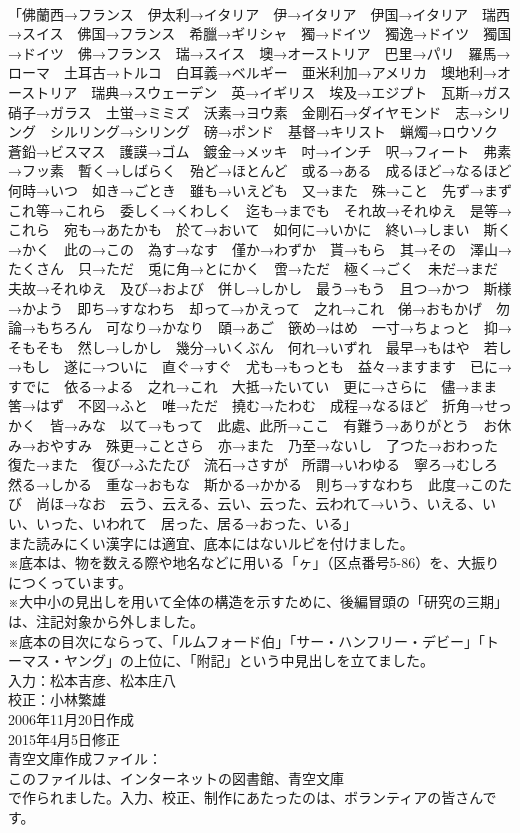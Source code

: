 \documentclass[8pt]{extreport}
\begin{document}
\begin{CJK}{UTF8}{min}
\\	「佛蘭西→フランス　伊太利→イタリア　伊→イタリア　伊国→イタリア　瑞西→スイス　佛国→フランス　希臘→ギリシャ　獨→ドイツ　獨逸→ドイツ　獨国→ドイツ　佛→フランス　瑞→スイス　墺→オーストリア　巴里→パリ　羅馬→ローマ　土耳古→トルコ　白耳義→ベルギー　亜米利加→アメリカ　墺地利→オーストリア　瑞典→スウェーデン　英→イギリス　埃及→エジプト　瓦斯→ガス　硝子→ガラス　土蛍→ミミズ　沃素→ヨウ素　金剛石→ダイヤモンド　志→シリング　シルリング→シリング　磅→ポンド　基督→キリスト　蝋燭→ロウソク　蒼鉛→ビスマス　護謨→ゴム　鍍金→メッキ　吋→インチ　呎→フィート　弗素→フッ素　暫く→しばらく　殆ど→ほとんど　或る→ある　成るほど→なるほど　何時→いつ　如き→ごとき　雖も→いえども　又→また　殊→こと　先ず→まず　これ等→これら　委しく→くわしく　迄も→までも　それ故→それゆえ　是等→これら　宛も→あたかも　於て→おいて　如何に→いかに　終い→しまい　斯く→かく　此の→この　為す→なす　僅か→わずか　貰→もら　其→その　澤山→たくさん　只→ただ　兎に角→とにかく　啻→ただ　極く→ごく　未だ→まだ　夫故→それゆえ　及び→および　併し→しかし　最う→もう　且つ→かつ　斯様→かよう　即ち→すなわち　却って→かえって　之れ→これ　俤→おもかげ　勿論→もちろん　可なり→かなり　頤→あご　篏め→はめ　一寸→ちょっと　抑→そもそも　然し→しかし　幾分→いくぶん　何れ→いずれ　最早→もはや　若し→もし　遂に→ついに　直ぐ→すぐ　尤も→もっとも　益々→ますます　已に→すでに　依る→よる　之れ→これ　大抵→たいてい　更に→さらに　儘→まま　筈→はず　不図→ふと　唯→ただ　撓む→たわむ　成程→なるほど　折角→せっかく　皆→みな　以て→もって　此處、此所→ここ　有難う→ありがとう　お休み→おやすみ　殊更→ことさら　亦→また　乃至→ないし　了つた→おわった　復た→また　復び→ふたたび　流石→さすが　所謂→いわゆる　寧ろ→むしろ　然る→しかる　重な→おもな　斯かる→かかる　則ち→すなわち　此度→このたび　尚ほ→なお　云う、云える、云い、云った、云われて→いう、いえる、いい、いった、いわれて　居った、居る→おった、いる」
\\	また読みにくい漢字には適宜、底本にはないルビを付けました。
\\	※底本は、物を数える際や地名などに用いる「ヶ」（区点番号5-86）を、大振りにつくっています。
\\	※大中小の見出しを用いて全体の構造を示すために、後編冒頭の「研究の三期」は、注記対象から外しました。
\\	※底本の目次にならって、「ルムフォード伯」「サー・ハンフリー・デビー」「トーマス・ヤング」の上位に、「附記」という中見出しを立てました。
\\	入力：松本吉彦、松本庄八
\\	校正：小林繁雄
\\	2006年11月20日作成
\\	2015年4月5日修正
\\	青空文庫作成ファイル：
\\	このファイルは、インターネットの図書館、青空文庫
\\	で作られました。入力、校正、制作にあたったのは、ボランティアの皆さんです。
\end{CJK}
\end{document}
